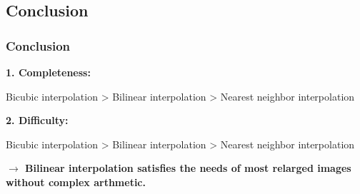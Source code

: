 \documentclass[notheorems,serif,table,compress]{beamer}  %
\begin{document}
\subsection{Conclusion}
\begin{frame}
\frametitle{Conclusion}
	\textbf{\color{blue}1. Completeness: }\\
	\mbox{}
	\begin{minipage}[t]{1\linewidth}
        \centering
        Bicubic interpolation  > Bilinear interpolation > Nearest neighbor interpolation
        \end{minipage}
	\mbox{}
	\begin{minipage}[t]{1\linewidth}
	\textbf{\color{blue}2. Difficulty: }\\
	\end{minipage}
	\mbox{}
	\begin{minipage}[t]{1\linewidth}
        \centering
        Bicubic interpolation  > Bilinear interpolation > Nearest neighbor interpolation
        \end{minipage}
	\mbox{}
	\begin{minipage}[t]{1\linewidth}
	\textbf{\color{red}$\rightarrow$ Bilinear interpolation satisfies the needs of most relarged images without complex arthmetic.}
	\end{minipage}
\end{frame}
\end{document}
